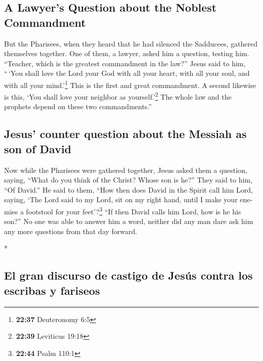 \begin{paracol}{2}
\begin{otherlanguage}{english}
\hypertarget{a-lawyers-question-about-the-noblest-commandment}{%
\subsection{A Lawyer's Question about the Noblest
Commandment}\label{a-lawyers-question-about-the-noblest-commandment}}

 But the Pharisees, when they heard that he had silenced
the Sadducees, gathered themselves together.  One of
them, a lawyer, asked him a question, testing him. 
``Teacher, which is the greatest commandment in the law?''
 Jesus said to him, ``\,`You shall love the Lord your God
with all your heart, with all your soul, and with all your
mind.'\footnote{\textbf{22:37} Deuteronomy 6:5}  This is
the first and great commandment.  A second likewise is
this, `You shall love your neighbor as yourself.'\footnote{\textbf{22:39}
  Leviticus 19:18}  The whole law and the prophets depend
on these two commandments.''

\hypertarget{jesus-counter-question-about-the-messiah-as-son-of-david}{%
\subsection{Jesus' counter question about the Messiah as son of
David}\label{jesus-counter-question-about-the-messiah-as-son-of-david}}

 Now while the Pharisees were gathered together, Jesus
asked them a question,  saying, ``What do you think of
the Christ? Whose son is he?'' They said to him, ``Of David.''
 He said to them, ``How then does David in the Spirit
call him Lord, saying,  `The Lord said to my Lord, sit on
my right hand, until I make your enemies a footstool for your
feet'?\footnote{\textbf{22:44} Psalm 110:1}  ``If then
David calls him Lord, how is he his son?''  No one was
able to answer him a word, neither did any man dare ask him any more
questions from that day forward.

\end{otherlanguage}

\switchcolumn[0]*

\hypertarget{el-gran-discurso-de-castigo-de-jesuxfas-contra-los-escribas-y-fariseos}{%
\subsection{El gran discurso de castigo de Jesús contra los escribas y
fariseos}\label{el-gran-discurso-de-castigo-de-jesuxfas-contra-los-escribas-y-fariseos}}


\end{paracol}
